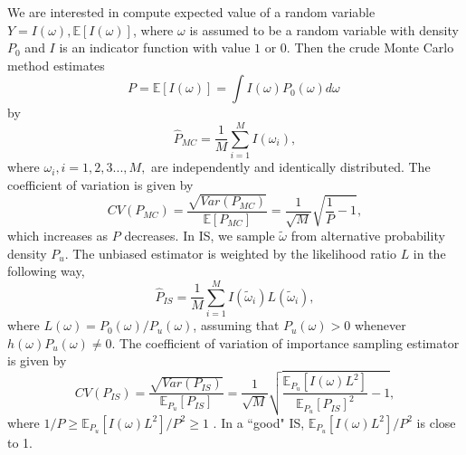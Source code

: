 \documentclass[journal,transmag]{IEEEtran}
\begin{document}
We are interested in compute expected value of a random variable $Y = I(\omega), \mathbb{E}[I(\omega)]$, where $\omega$ is assumed to be a random variable with density $P_0$ and $I$ is an indicator function with value $1$ or $0$. Then the crude Monte Carlo method estimates 
\begin{equation}
P= \mathbb{E}[I(\omega)] = \int I(\omega)P_0(\omega)d\omega \  
\end{equation}
by
\begin{equation}
\hat{P}_{MC} = \frac 1 M \sum_{i=1}^M I(\omega_i),
\end{equation}
where $\omega_i, i = 1, 2 ,3 ..., M,$ are independently and identically distributed. The coefficient of variation is given by 
\begin{equation}
CV(P_{MC}) = \frac{\sqrt{Var(P_{MC} )}}{\mathbb{E}[P_{MC}]}  = \frac{1}{\sqrt{M}} \sqrt{\frac{1}{ P}-1},
\end{equation}
which increases as $P$ decreases. 
In IS, we sample $\tilde{\omega}$ from alternative probability density $P_u$. The unbiased estimator is weighted by the likelihood ratio $L$ in the following way,
\begin{equation}
 \hat{P}_{IS} = \frac 1 M \sum_{i=1}^M I(\tilde{\omega}_i)L(\tilde{\omega}_i),
\end{equation}
where $L(\omega) = {P_0(\omega)}/{P_u(\omega)}$, assuming that $P_u(\omega) >0$ whenever $h(\omega)P_u(\omega) \ne 0.$ The coefficient of variation of importance sampling estimator is given by 
\begin{equation}
CV(P_{IS}) = \frac{\sqrt{Var(P_{IS} )}}{\mathbb{E}_{P_u}[P_{IS}]}  = \frac{1}{\sqrt{M}}\sqrt{\frac{\mathbb{E}_{P_u}[I(\omega)L^2]}{ \mathbb{E}_{P_u}[P_{IS}]^2}-1}, 
\end{equation}
where $1/P \ge {\mathbb{E}_{P_u}[I(\omega)L^2]}/P^2 \ge 1$ \cite{Rubino:2009:RES:1643623}. In a ``good" IS, ${\mathbb{E}_{P_u}[I(\omega)L^2]}/P^2 $ is close to 1.
\end{document}
